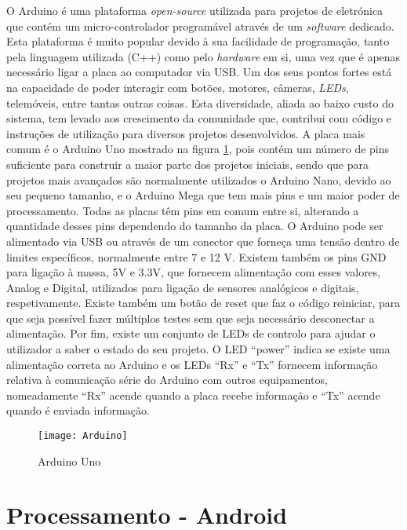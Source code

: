 O Arduino é uma plataforma \emph{open-source} utilizada  para projetos de eletrónica que contém um micro-controlador programável através de um \emph{software} dedicado.
Esta plataforma é muito popular devido à sua facilidade de programação, tanto pela linguagem utilizada (C++) como pelo \emph{hardware} em si, uma vez que é apenas necessário ligar a placa ao computador via USB.
Um dos seus pontos fortes está na capacidade de poder interagir com botões, motores, câmeras, \emph{LEDs}, telemóveis, entre tantas outras coisas.
Esta diversidade, aliada  ao baixo custo do sistema, tem levado aos crescimento da comunidade que, contribui com código e instruções de utilização para diversos projetos desenvolvidos.
A placa mais comum é o Arduino Uno mostrado na figura \ref{fig:arduino}, pois contém um número de pins suficiente para construir a maior parte dos projetos iniciais, sendo que para projetos mais avançados são normalmente utilizados o Arduino Nano, devido ao seu pequeno tamanho, e o Arduino Mega que tem mais pins e um maior poder de processamento.
Todas as placas têm pins em comum entre si, alterando a quantidade desses pins dependendo do tamanho da placa.
O Arduino pode ser alimentado via USB ou através de um conector que forneça uma tensão dentro de limites específicos, normalmente entre 7 e 12 V.
Existem também os pins GND para ligação à massa, 5V e 3.3V, que fornecem alimentação com esses valores, Analog e Digital, utilizados para ligação de sensores analógicos e digitais, respetivamente.
Existe também um botão de reset que faz o código reiniciar, para que seja possível fazer múltiplos testes sem que seja necessário desconectar a alimentação.
Por fim, existe um conjunto de LEDs de controlo para ajudar o utilizador a saber o estado do seu projeto.
O LED ``power'' indica se existe uma alimentação correta ao Arduino e os LEDs ``Rx'' e ``Tx'' fornecem informação relativa à comunicação série do Arduino com outros equipamentos, nomeadamente ``Rx'' acende quando a placa recebe informação e ``Tx'' acende quando é enviada informação.

\begin{figure}[hbtp]
	\centering
	\texttt{[image: Arduino]}
	\caption[Arduino Uno]{Arduino Uno \footnotemark}
	\label{fig:arduino}
\end{figure}

\section{Processamento - Android}
\label{sec:android}

